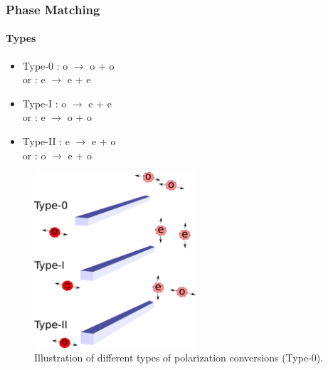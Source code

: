 \documentclass[serif,8pt]{beamer}
\begin{document}
\begin{frame}[t]
	\frametitle{Phase Matching}
	\framesubtitle{Types}
	\begin{minipage}[l]{0.35\textwidth}
		\begin{itemize}
				\item Type-0 : o $\rightarrow$ o + o\\
							 or : e $\rightarrow$ e + e
				\item Type-I : o $\rightarrow$ e + e\\
							 or : e $\rightarrow$ o + o
				\item Type-II : e $\rightarrow$ e + o\\
							  or : o $\rightarrow$ e + o
		\end{itemize}
	\end{minipage}
	\begin{minipage}[r]{0.60\textwidth}
		\begin{figure}
			\begin{center}
				\includegraphics[width=6cm]{TypesOfConversions}
			\end{center}
			\caption{Illustration of different types of polarization conversions (Type-0).}
		\end{figure}
	\end{minipage}
\end{frame}
\end{document}
